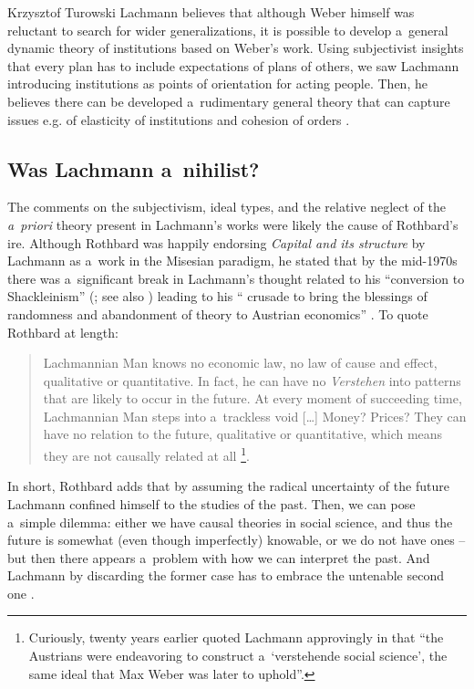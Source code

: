 \begin{artengenv}{Krzysztof Turowski}
Lachmann believes that although Weber himself was reluctant to search for wider generalizations, it is possible to develop a~general dynamic theory of institutions based on Weber's work.
Using subjectivist insights that every plan has to include expectations of plans of others, we saw Lachmann introducing institutions as points of orientation for acting people. Then, he believes there can be developed a~rudimentary general theory that can capture issues e.g. of elasticity of institutions and cohesion of orders \parencite[8]{lachmann-weber}.

\subsection{Was Lachmann a~nihilist?}


The comments on the subjectivism, ideal types, and the relative neglect of the \emph{a~priori} theory present in Lachmann's works were likely the cause of Rothbard's ire.
Although Rothbard was happily endorsing \emph{Capital and its structure} by Lachmann as a~work in the Misesian paradigm, he stated that by the mid-1970s there was a~significant break in Lachmann's thought related to his ``conversion to Shackleinism'' (\cite[53]{rothbard-present}; see also \cite{barbieri2021lachmann}) leading to his `` crusade to bring the blessings of randomness and abandonment of theory to Austrian economics'' \parencite[56--57]{rothbard-hermeneutic}. To quote Rothbard at length:
\begin{quote}
Lachmannian Man knows no economic law, no law of cause and effect, qualitative or quantitative. In fact, he can have no \emph{Verstehen} into patterns that are likely to occur in the future. At every moment of succeeding time, Lachmannian Man steps into a~trackless void [\ldots] Money? Prices? They can have no relation to the future, qualitative or quantitative, which means they are not causally related at all \parencite[52]{rothbard-present}\footnote{Curiously, twenty years earlier \textcite[50]{rothbard-praxeology-method} quoted Lachmann approvingly in that ``the Austrians were endeavoring to construct a~`verstehende social science', the same ideal that Max Weber was later to uphold''.}.
\end{quote}
In short, Rothbard adds that by assuming the radical uncertainty of the future Lachmann confined himself to the studies of the past.
Then, we can pose a~simple dilemma: either we have causal theories in social science, and thus the future is somewhat (even though imperfectly) knowable, or we do not have ones -- but then there appears a~problem with how we can interpret the past. And Lachmann by discarding the former case has to embrace the untenable second one \parencite[53--54]{rothbard-present}.


\end{artengenv}
